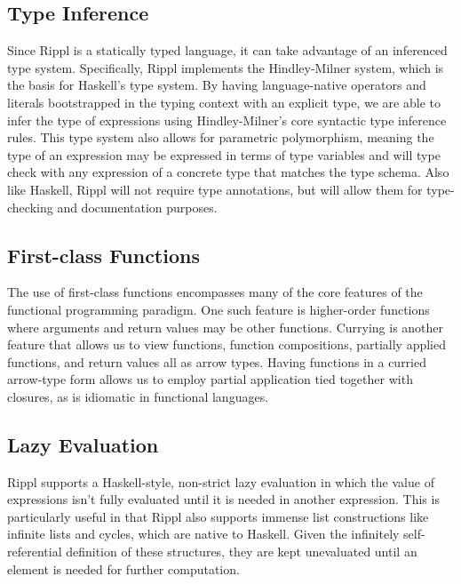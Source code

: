 ﻿\documentclass[5pt]{article}
\begin{document}
\subsection{Type Inference}
Since Rippl is a statically typed language, it can take advantage of an inferenced type system. Specifically, Rippl implements the Hindley-Milner system, which is the basis for Haskell’s type system. By having language-native operators and literals bootstrapped in the typing context with an explicit type, we are able to infer the type of expressions using Hindley-Milner's core syntactic type inference rules. This type system also allows for parametric polymorphism, meaning the type of an expression may be expressed in terms of type variables and will type check with any expression of a concrete type that matches the type schema. Also like Haskell, Rippl will not require type annotations, but will allow them for type-checking and documentation purposes.
\subsection{First-class Functions}
The use of first-class functions encompasses many of the core features of the functional programming paradigm. One such feature is higher-order functions where arguments and return values may be other functions. Currying is another feature that allows us to view functions, function compositions, partially applied functions, and return values all as arrow types. Having functions in a curried arrow-type form allows us to employ partial application tied together with closures, as is idiomatic in functional languages.
\subsection{Lazy Evaluation}
Rippl supports a Haskell-style, non-strict lazy evaluation in which the value of expressions isn’t fully evaluated until it is needed in another expression. This is particularly useful in that Rippl also supports immense list constructions like infinite lists and cycles, which are native to Haskell. Given the infinitely self-referential definition of these structures, they are kept unevaluated until an element is needed for further computation.
\pagebreak
\end{document}
